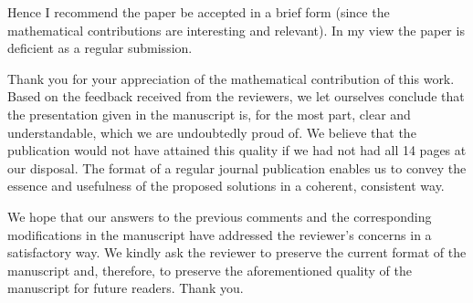 \begin{reviewer}
Hence I recommend the paper be accepted in a brief form (since the mathematical
contributions are interesting and relevant). In my view the paper is deficient
as a regular submission.
\end{reviewer}

\begin{authors}
Thank you for your appreciation of the mathematical contribution of this work.
Based on the feedback received from the reviewers, we let ourselves conclude
that the presentation given in the manuscript is, for the most part, clear and
understandable, which we are undoubtedly proud of. We believe that the
publication would not have attained this quality if we had not had all 14 pages
at our disposal. The format of a regular journal publication enables us to
convey the essence and usefulness of the proposed solutions in a coherent,
consistent way.

We hope that our answers to the previous comments and the corresponding
modifications in the manuscript have addressed the reviewer's concerns in a
satisfactory way. We kindly ask the reviewer to preserve the current format of
the manuscript and, therefore, to preserve the aforementioned quality of the
manuscript for future readers. Thank you.
\end{authors}
